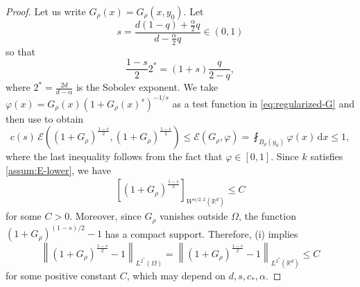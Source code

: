 \documentclass[reqno]{amsart}
\theoremstyle{plain}
\theoremstyle{definition}
\numberwithin{equation}{section}
\newcommand{\Rd}{\mathbb{R}^d}
\newcommand{\dx} {\, \mathrm{d}x}
\newcommand{\cl} {c_{\ast}}
\begin{document}
\begin{proof}
Let us write $G_\rho(x) = G_\rho(x,y_0)$. Let
\begin{equation*}
s = \frac{d(1-q)+\frac{\alpha}{2}q}{d-\frac{\alpha}{2}q} \in (0, 1)
\end{equation*}
so that
\begin{equation} \label{eq:s}
\frac{1-s}{2} 2^{\ast} = (1+s) \frac{q}{2-q},
\end{equation}
where $2^{\ast} = \frac{2d}{d-\alpha}$ is the Sobolev exponent. We take $\varphi(x) = G_\rho(x) (1+ G_\rho(x)^s)^{-1/s}$ as a test function in \eqref{eq:regularized-G} and then use  to obtain
\begin{equation*}
c(s) \, \mathcal{E} \left( (1+G_\rho)^\frac{1-s}{2}, (1+G_\rho)^\frac{1-s}{2} \right) \leq \mathcal{E}(G_\rho, \varphi) = \fint_{B_\rho(y_0)} \varphi(x) \dx \leq 1,
\end{equation*}
where the last inequality follows from the fact that $\varphi \in [0,1]$.
Since $k$ satisfies \eqref{assum:E-lower}, we have
\begin{align} \label{eq:seminorm}
\left[ (1+G_\rho)^\frac{1-s}{2} \right]_{W^{\alpha/2, 2}(\Rd)} \leq C
\end{align}
for some $C > 0$. Moreover, since $G_{\rho}$ vanishes outside $\Omega$, the function $(1+G_\rho)^{(1-s)/2}-1$ has a compact support. Therefore,  (i) implies
\begin{equation} \label{eq:Lp}
\left\| (1+G_\rho)^{\frac{1-s}{2}}-1 \right\|_{L^{2^{\ast}}(\Omega)} = \left\| (1+G_\rho)^{\frac{1-s}{2}}-1 \right\|_{L^{2^{\ast}}(\Rd)} \leq C
\end{equation}
for some positive constant $C$, which may depend on $d, s, \cl, \alpha$.


\end{proof}
\end{document}
